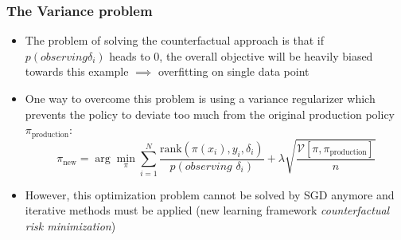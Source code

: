 \subsubsection{The Variance problem}
\begin{itemize}
	\item The problem of solving the counterfactual approach is that if $p(\textit{observing} \delta_i)$ heads to $0$, the overall objective will be heavily biased towards this example $\implies$ overfitting on single data point
	\item One way to overcome this problem is using a variance regularizer which prevents the policy to deviate too much from the original production policy $\pi_{\text{production}}$:
	$$\pi_{\text{new}} = \arg\min_{\pi} \sum\limits_{i=1}^{N} \frac{\text{rank}\left(\pi(x_i),y_i,\delta_i\right)}{p(\textit{observing }\delta_i)} + \lambda \sqrt{\frac{\mathcal{V}[\pi, \pi_{\text{production}}]}{n}}$$
	\item However, this optimization problem cannot be solved by SGD anymore and iterative methods must be applied (new learning framework \textit{counterfactual risk minimization})
\end{itemize}
